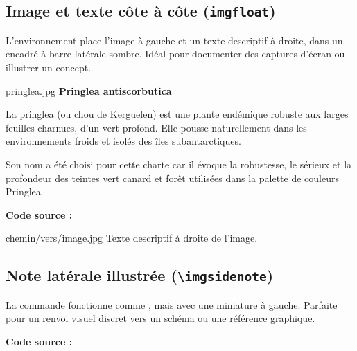 \subsection{Image et texte côte à côte (\texttt{imgfloat})}

L'environnement  place l'image à gauche et un texte descriptif à droite, dans un encadré à barre latérale sombre. Idéal pour documenter des captures d'écran ou illustrer un concept.

\begin{imgfloat}{pringlea.jpg}
  \textbf{Pringlea antiscorbutica}

  La pringlea (ou chou de Kerguelen) est une plante endémique robuste aux larges feuilles charnues, d'un vert profond. Elle pousse naturellement dans les environnements froids et isolés des îles subantarctiques.

  \vspace{4pt}
  Son nom a été choisi pour cette charte car il évoque la robustesse, le sérieux et la profondeur des teintes vert canard et forêt utilisées dans la palette de couleurs Pringlea.
\end{imgfloat}

\textbf{Code source :}
\begin{texblock}
\begin{imgfloat}{chemin/vers/image.jpg}
  Texte descriptif à droite de l'image.
\end{imgfloat}
\end{texblock}

\subsection{Note latérale illustrée (\texttt{\textbackslash imgsidenote})}

La commande  fonctionne comme , mais avec une miniature à gauche. Parfaite pour un renvoi visuel discret vers un schéma ou une référence graphique.


\textbf{Code source :}
\begin{texblock}
\end{texblock}

